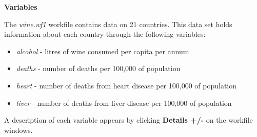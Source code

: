 \documentclass[12pt]{report}
\begin{document}
		\noindent \textbf{Variables} \par
			\noindent The \textit{wine.wf1} workfile contains data on 21 countries. This data set holds information about each country through the following variables:
			\vspace{-\baselineskip}
			\begin{itemize}
				\item \textit{alcohol} - litres of wine consumed per capita per annum
				\item \textit{deaths} - number of deaths per 100,000 of population
				\item \textit{heart} - number of deaths from heart disease per 100,000 of population
				\item \textit{liver} - number of deaths from liver disease per 100,000 of population
			\end{itemize}
			\vspace{-\baselineskip}
			\noindent A description of each variable appears by clicking \textbf{Details +/-} on the workfile windows.
			
\end{document}

